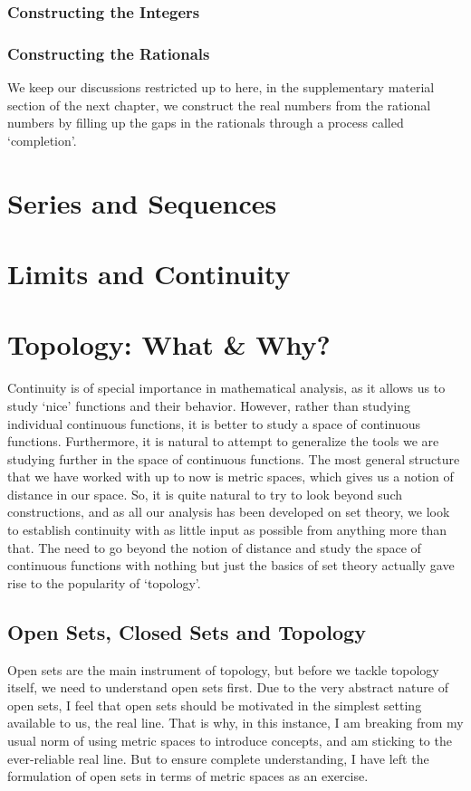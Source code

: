 \subsection{Constructing the Integers}
\subsection{Constructing the Rationals}
We keep our discussions restricted up to here, in the supplementary material section of the next chapter, we construct the real numbers from the rational numbers by filling up the gaps in the rationals through a process called `completion'.
\chapter{Series and Sequences}
\chapter{Limits and Continuity}
\chapter{Topology: What \& Why?}
Continuity is of special importance in mathematical analysis, as it allows us to study `nice' functions and their behavior. However, rather than studying individual continuous functions, it is better to study a space of continuous functions. Furthermore, it is natural to attempt to generalize the tools we are studying further in the space of continuous functions. The most general structure that we have worked with up to now is metric spaces, which gives us a notion of distance in our space. So, it is quite natural to try to look beyond such constructions, and as all our analysis has been developed on set theory, we look to establish continuity with as little input as possible from anything more than that. The need to go beyond the notion of distance and study the space of continuous functions with nothing but just the basics of set theory actually gave rise to the popularity of `topology'.
\section{Open Sets, Closed Sets and Topology}
Open sets are the main instrument of topology, but before we tackle topology itself, we need to understand open sets first. Due to the very abstract nature of open sets, I feel that open sets should be motivated in the simplest setting available to us, the real line. That is why, in this instance, I am breaking from my usual norm of using metric spaces to introduce concepts, and am sticking to the ever-reliable real line. But to ensure complete understanding, I have left the formulation of open sets in terms of metric spaces as an exercise.
